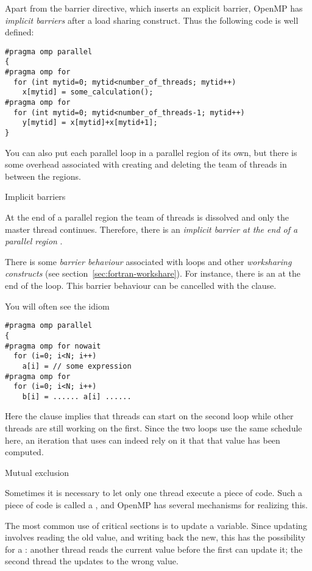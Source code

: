 Apart from the barrier directive, which inserts an explicit barrier,
OpenMP has \emph{implicit barriers} after
a load sharing construct. Thus the following code is well defined:
\begin{lstlisting}
#pragma omp parallel 
{
#pragma omp for
  for (int mytid=0; mytid<number_of_threads; mytid++)
    x[mytid] = some_calculation();
#pragma omp for
  for (int mytid=0; mytid<number_of_threads-1; mytid++)
    y[mytid] = x[mytid]+x[mytid+1];
}
\end{lstlisting}

You can also put each parallel loop in a parallel region of its own,
but there is some overhead associated with creating and deleting the
team of threads in between the regions.

 {Implicit barriers}

At the end of a parallel region the team of threads is dissolved and
only the master thread continues. Therefore, there is an
\emph{implicit barrier at the end of a parallel region}%
.

There is some \emph{barrier behaviour} associated with  loops and other
\emph{worksharing constructs} (see section~\ref{sec:fortran-workshare}).  For instance, there
is an  at the end of the loop. This
barrier behaviour can be cancelled with the 
clause.

You will often see the idiom
\begin{lstlisting}
#pragma omp parallel
{
#pragma omp for nowait
  for (i=0; i<N; i++)
    a[i] = // some expression
#pragma omp for
  for (i=0; i<N; i++)
    b[i] = ...... a[i] ......
\end{lstlisting}
Here the  clause implies that threads can start on the second loop
while other threads are still working on the first. Since the two loops use the same
schedule here, an iteration that uses  can indeed rely on it that that 
value has been computed.

 {Mutual exclusion}

Sometimes it is necessary to let only one thread execute a piece of code.
Such a piece of code is called a , and
OpenMP has several mechanisms for realizing this.

The most common use of critical sections is to update a variable. Since updating
involves reading the old value, and writing back the new, this has the possibility
for a : another thread reads the current value
before the first can update it; the second thread the updates to the wrong value.

